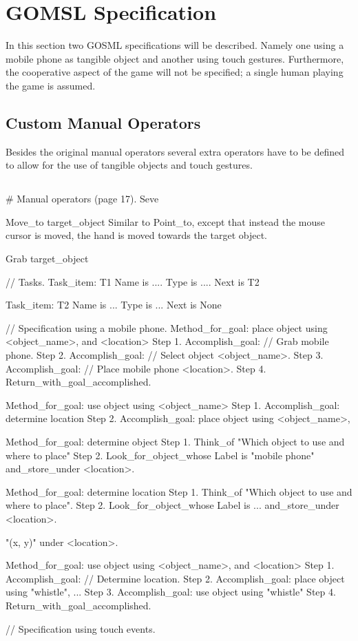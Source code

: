 \documentclass[a4paper,11pt]{report}
\begin{document}
	\section{GOMSL Specification}
	In this section two GOSML specifications will be described. Namely one using a mobile phone as tangible object and another using touch gestures. Furthermore, the cooperative aspect of the game will not be specified; a single human playing the game is assumed.
	
		\subsection{Custom Manual Operators}
		Besides the original manual operators several extra operators have to be defined to allow for the use of tangible objects and touch gestures.
		
		\subsection{}

# Manual operators (page 17).
Seve

Move_to target_object
Similar to Point_to, except that instead the mouse cursor is moved, the hand is moved towards the target object.

Grab target_object


// Tasks.
Task_item: T1
	Name is ....
	Type is ....
	Next is T2
	
Task_item: T2
	Name is ...
	Type is ...
	Next is None

// Specification using a mobile phone.
Method_for_goal: place object using <object_name>, and <location>
	Step 1. Accomplish_goal: // Grab mobile phone.
	Step 2. Accomplish_goal: // Select object <object_name>.
	Step 3. Accomplish_goal: // Place mobile phone <location>.
	Step 4. Return_with_goal_accomplished.
	
Method_for_goal: use object using <object_name>
	Step 1. Accomplish_goal: determine location
	Step 2. Accomplish_goal: place object using <object_name>, 


Method_for_goal: determine object
	Step 1. Think_of "Which object to use and where to place"
	Step 2. Look_for_object_whose Label is "mobile phone"
			and_store_under <location>.


Method_for_goal: determine location
	Step 1. Think_of "Which object to use and where to place".
	Step 2. Look_for_object_whose Label is ...
	 		and_store_under <location>.
	
	"(x, y)" under <location>.
	


Method_for_goal: use object using <object_name>, and <location>
	Step 1. Accomplish_goal: // Determine location.
	Step 2. Accomplish_goal: place object using "whistle", ...
	Step 3. Accomplish_goal: use object using "whistle"
	Step 4. Return_with_goal_accomplished.

// Specification using touch events.
\end{document}
